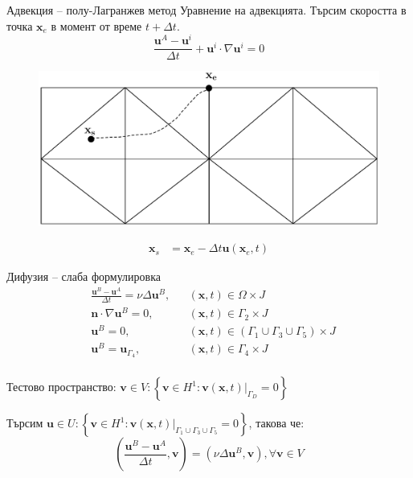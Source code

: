\documentclass{beamer}
\newcommand{\dotprod}[2]{\left(#1, #2\right)}
\newcommand{\grad}[1]{\nabla#1}
\newcommand{\lapl}[1]{\Delta#1}
\newcommand{\vecf}[1]{\textbf{#1}}
\begin{document}
\begin{frame}{Адвекция -- полу-Лагранжев метод}
    		Уравнение на адвекцията. Търсим скоростта в точка $\vecf{x}_e$ в момент от време $t + \Delta t$.
		$$
			\frac{\vecf{u}^A - \vecf{u}^i}{\Delta t} + \vecf{u}^i \cdot \nabla\vecf{u}^i = 0
		$$

\begin{figure}[H]
	\includegraphics[width=0.7\linewidth]{../Figures/semi-lagrangian.pdf}
\end{figure}
\begin{align*}
\textbf{x}_s &= \textbf{x}_e - \Delta t \textbf{u}(\textbf{x}_e, t)
\end{align*}
\end{frame}
    
    
\begin{frame}{Дифузия -- слаба формулировка}
	\begin{align*}
		&\frac{\vecf{u}^B - \vecf{u}^A}{\Delta t} =\nu \Delta \vecf{u}^B, &&\left(\vecf{x}, t\right) \in \Omega \times J\\
		&\vecf{n} \cdot \grad{\vecf{u}^B} = 0, && \left(\vecf{x}, t\right) \in \Gamma_2 \times J \\
		&\vecf{u}^B = 0, &&\left(\vecf{x}, t\right) \in \left(\Gamma_1 \cup \Gamma_3 \cup \Gamma_5\right) \times J \\
		&\vecf{u}^B = \vecf{u}_{\Gamma_4}, && \left(\vecf{x}, t\right) \in \Gamma_4 \times J \\
	\end{align*}

	Тестово пространство: $\vecf{v} \in V : \left\{\vecf{v} \in H^1 : \vecf{v}(\vecf{x}, t)|_{\Gamma_D} = 0 \right\}$
	
	Търсим $\vecf{u} \in U : \left\{\vecf{v} \in H^1 : \vecf{v}(\vecf{x}, t)|_{\Gamma_1 \cup \Gamma_3 \cup \Gamma_5} = 0\right\}$, такова че:
	$$
	\dotprod{\frac{\vecf{u}^{B} - \vecf{u}^{A}}{\Delta t}}{\vecf{v}} = \dotprod{\nu\lapl{\vecf{u}^B}}{\vecf{v}}, \forall\vecf{v} \in V
	$$
\end{frame}
\end{document}
